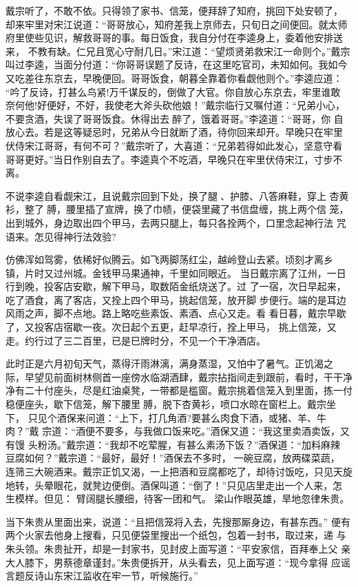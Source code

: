 戴宗听了，不敢不依。只得领了家书、信笼，便拜辞了知府，挑回下处安顿了，
却来牢里对宋江说道：“哥哥放心，知府差我上京师去，只旬日之间便回。就太师
府里使些见识，解救哥哥的事。每日饭食，我自分付在李逵身上，委着他安排送来，
不教有缺。仁兄且宽心守耐几日。”宋江道：“望烦贤弟救宋江一命则个。”戴宗
叫过李逵，当面分付道：“你哥哥误题了反诗，在这里吃官司，未知如何。我如今
又吃差往东京去，早晚便回。哥哥饭食，朝暮全靠着你看觑他则个。”李逵应道：
“吟了反诗，打甚么鸟紧!万千谋反的，倒做了大官。你自放心东京去，牢里谁敢
奈何他!好便好，不好，我使老大斧头砍他娘！”戴宗临行又嘱付道：“兄弟小心，
不要贪酒，失误了哥哥饭食。休得出去醉了，饿着哥哥。”李逵道：“哥哥，你
自放心去。若是这等疑忌时，兄弟从今日就断了酒，待你回来却开。早晚只在牢里
伏侍宋江哥哥，有何不可？”戴宗听了，大喜道：“兄弟若得如此发心，坚意守看
哥哥更好。”当日作别自去了。李逵真个不吃酒，早晚只在牢里伏侍宋江，寸步不
离。

不说李逵自看觑宋江，且说戴宗回到下处，换了腿、护膝、八答麻鞋，穿上
杏黄衫，整了膊，腰里插了宣牌，换了巾帻，便袋里藏了书信盘缠，挑上两个信
笼，出到城外，身边取出四个甲马，去两只腿上，每只各拴两个，口里念起神行法
咒语来。怎见得神行法效验?

仿佛浑如驾雾，依稀好似腾云。如飞两脚荡红尘，越岭登山去紧。顷刻才离乡
镇，片时又过州城。金钱甲马果通神，千里如同眼近。
当日戴宗离了江州，一日行到晚，投客店安歇，解下甲马，取数陌金纸烧送了。过
了一宿，次日早起来，吃了酒食，离了客店，又拴上四个甲马，挑起信笼，放开脚
步便行。端的是耳边风雨之声，脚不点地。路上略吃些素饭、素酒、点心又走。看
看日暮，戴宗早歇了，又投客店宿歇一夜。次日起个五更，赶早凉行，拴上甲马，
挑上信笼，又走。约行过了三二百里，已是巳牌时分，不见一个干净酒店。

此时正是六月初旬天气，蒸得汗雨淋漓，满身蒸湿，又怕中了暑气。正饥渴之
际，早望见前面树林侧首一座傍水临湖酒肆，戴宗拈指间走到跟前，看时，干干净
净有二十付座头，尽是红油桌凳，一带都是槛窗。戴宗挑着信笼入到里面，拣一付
稳便座头，歇下信笼，解下腰里膊，脱下杏黄衫，喷口水晾在窗栏上。戴宗坐下，
只见个酒保来问道：“上下，打几角酒?要甚么肉食下酒，或猪、羊、牛肉？”戴
宗道：“酒便不要多，与我做口饭来吃。”酒保又道：“我这里卖酒卖饭，又有馒
头粉汤。”戴宗道：“我却不吃荤腥，有甚么素汤下饭？”酒保道：“加料麻辣
豆腐如何？”戴宗道：“最好，最好！”酒保去不多时，一碗豆腐，放两碟菜蔬，
连筛三大碗酒来。戴宗正饥又渴，一上把酒和豆腐都吃了，却待讨饭吃，只见天旋
地转，头晕眼花，就凳边便倒。酒保叫道：“倒了！”只见店里走出一个人来，怎
生模样。但见：
臂阔腿长腰细，待客一团和气。
梁山作眼英雄，旱地忽律朱贵。

当下朱贵从里面出来，说道：“且把信笼将入去，先搜那厮身边，有甚东西。”
便有两个火家去他身上搜看，只见便袋里搜出一个纸包，包着一封书，取过来，递
与朱头领。朱贵扯开，却是一封家书，见封皮上面写道：“平安家信，百拜奉上父
亲大人膝下，男蔡德章谨封。”朱贵便拆开，从头看去，见上面写道：“现今拿得
应谣言题反诗山东宋江监收在牢一节，听候施行。”

